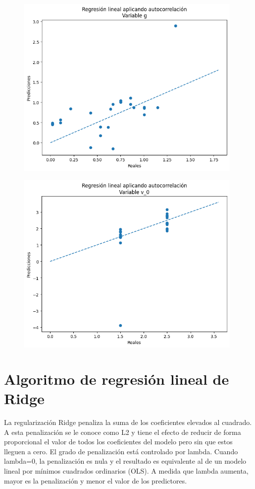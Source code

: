 \documentclass[oneside,openright,titlepage,numbers=noenddot,openany,headinclude,footinclude=true,
cleardoublepage=empty,abstractoff,BCOR=5mm,paper=a4,fontsize=12pt,main=spanish]{scrreprt}
\begin{document}
\begin{figure}[H]
	\centering
	\includegraphics[width=11cm]{Regresión lineal aplicando autocorrelación Variable g.png}
\end{figure}

\begin{figure}[H]
	\centering
	\includegraphics[width=11cm]{Regresión lineal aplicando autocorrelación Variable v_0.png}
\end{figure}

\section{Algoritmo de regresión lineal de Ridge}

La regularización Ridge penaliza la suma de los coeficientes elevados al cuadrado. A esta penalización se le conoce como L2 y tiene el efecto de reducir de forma proporcional el valor de todos los coeficientes del modelo pero sin que estos lleguen a cero. El grado de penalización está controlado por lambda. Cuando lambda=0, la penalización es nula y el resultado es equivalente al de un modelo lineal por mínimos cuadrados ordinarios (OLS). A medida que lambda aumenta, mayor es la penalización y menor el valor de los predictores.
\end{document}
